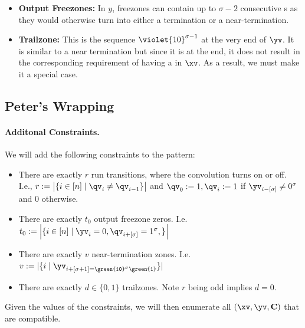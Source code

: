 \begin{itemize}
  \item \textbf{Output Freezones:} In $y$, freezones can contain up to $\sigma-2$ consecutive \texttt{}s as they would otherwise turn into either a termination or a near-termination.

  \item \textbf{Trailzone:} This is the sequence $\violet{10}^{\sigma-1}$ at the very end of $\yv$. It is similar to a near termination but since it is at the end, it does not result in the corresponding requirement of having a  in $\xv$. As a result, we must make it a special case.
\end{itemize}

\subsection{Peter's Wrapping}

\paragraph{Additonal Constraints.}
We will add the following constraints to the pattern:
\begin{itemize}
  \item There are exactly $r$ run transitions, where the convolution turns on or off. I.e., $r:=\left|\{i\in [n] \mid \qv_{i}\neq \qv_{i-1} \}\right|$ and $\qv_0:=1,\qv_i:=1$ if $\yv_{i-[\sigma]}\neq0^\sigma$ and 0 otherwise.
  \item There are exactly $t_0$ output freezone zeros. I.e. $t_0:=\left|\{i \in [n] \mid \yv_i=0,\qv_{i+[\sigma]}=1^\sigma,\}\right|$
  \item There are exactly $v$ near-termination zones. I.e. $v:=|\{ i \mid \yv_{i+[\sigma+1] = \texttt{\green{10}}^{\sigma}\texttt{\green{1}}}\}|$
  \item There are exactly $d\in\{0,1\}$ trailzones. Note $r$ being odd implies $d=0$.
\end{itemize}

Given the values of the constraints, we will then enumerate all $(\xv,\yv,\C)$ that are compatible.

